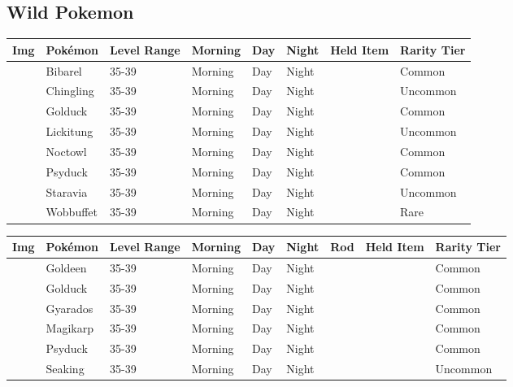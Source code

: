 \subsection{Wild Pokemon}%
\label{subsec:WildPokemon}%
\begin{longtable}{||l l l l l l l l||}%
\hline%
Img&Pokémon&Level Range&Morning&Day&Night&Held Item&Rarity Tier\\%
\hline%
\endhead%
\hline%
&Bibarel&35{-}39&Morning&Day&Night&&Common\\%
\hline%
&Chingling&35{-}39&Morning&Day&Night&&Uncommon\\%
\hline%
&Golduck&35{-}39&Morning&Day&Night&&Common\\%
\hline%
&Lickitung&35{-}39&Morning&Day&Night&&Uncommon\\%
\hline%
&Noctowl&35{-}39&Morning&Day&Night&&Common\\%
\hline%
&Psyduck&35{-}39&Morning&Day&Night&&Common\\%
\hline%
&Staravia&35{-}39&Morning&Day&Night&&Uncommon\\%
\hline%
&Wobbuffet&35{-}39&Morning&Day&Night&&Rare\\%
\hline%
\end{longtable}%
\begin{longtable}{||l l l l l l l l l||}%
\hline%
Img&Pokémon&Level Range&Morning&Day&Night&Rod&Held Item&Rarity Tier\\%
\hline%
\endhead%
\hline%
&Goldeen&35{-}39&Morning&Day&Night&&&Common\\%
\hline%
&Golduck&35{-}39&Morning&Day&Night&&&Common\\%
\hline%
&Gyarados&35{-}39&Morning&Day&Night&&&Common\\%
\hline%
&Magikarp&35{-}39&Morning&Day&Night&&&Common\\%
\hline%
&Psyduck&35{-}39&Morning&Day&Night&&&Common\\%
\hline%
&Seaking&35{-}39&Morning&Day&Night&&&Uncommon\\%
\hline%
\end{longtable}